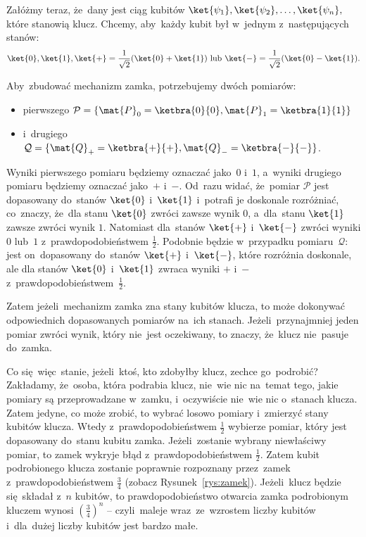 Załóżmy teraz, że~dany jest ciąg kubitów
$
	\ket{\psi_1},\ket{\psi_2},\ldots,\ket{\psi_n},
$
które stanowią klucz.
Chcemy, aby~każdy kubit był w~jednym z~następujących stanów:
$$
	\ket{0}, \ket{1}, \ket{+}=\frac{1}{\sqrt{2}}(\ket{0}+\ket{1}) \text{ lub } \ket{-}=\frac{1}{\sqrt{2}}(\ket{0}-\ket{1}).
$$

Aby~zbudować mechanizm zamka, potrzebujemy dwóch pomiarów:
\begin{itemize}
	\item pierwszego $\mathcal{P}=\{\mat{P}_0=\ketbra{0}{0}, \mat{P}_1=\ketbra{1}{1}\}$
	\item i~drugiego
	      $\mathcal{Q}=\{\mat{Q}_+=\ketbra{+}{+}, \mat{Q}_-=\ketbra{-}{-}\}$.
\end{itemize}
Wyniki pierwszego pomiaru
będziemy oznaczać jako~$0$ i~$1$, a~wyniki drugiego pomiaru będziemy oznaczać jako~$+$ i~$-$. Od~razu widać, że~pomiar
$\mathcal{P}$ jest dopasowany do~stanów $\ket{0}$ i~$\ket{1}$ i~potrafi
je doskonale rozróżniać, co~znaczy, że~dla stanu $\ket{0}$ zwróci zawsze wynik
$0$, a~dla~stanu $\ket{1}$ zawsze zwróci wynik $1$. Natomiast dla~stanów
$\ket{+}$ i~$\ket{-}$ zwróci wyniki $0$ lub~$1$ z~prawdopodobieństwem
$\frac{1}{2}$. Podobnie będzie w~przypadku pomiaru~$\mathcal{Q}$: jest
on~dopasowany do~stanów $\ket{+}$ i~$\ket{-}$, które rozróżnia doskonale,
ale dla stanów $\ket{0}$ i~$\ket{1}$ zwraca wyniki $+$ i~$-$ z~prawdopodobieństwem~$\frac{1}{2}$.

Zatem jeżeli~mechanizm zamka zna stany kubitów klucza, to może dokonywać
odpowiednich dopasowanych pomiarów na~ich stanach. Jeżeli~przynajmniej jeden pomiar zwróci
wynik, który nie~jest oczekiwany, to znaczy, że~klucz nie~pasuje do~zamka.

Co się~więc~stanie, jeżeli~ktoś, kto zdobyłby klucz, zechce go~podrobić?
Zakładamy, że~osoba, która podrabia klucz, nie~wie nic na~temat tego, jakie pomiary są
przeprowadzane w~zamku, i~oczywiście nie~wie nic o~stanach klucza. Zatem jedyne, co może zrobić,
to wybrać losowo pomiary i~zmierzyć stany kubitów klucza. Wtedy z~prawdopodobieństwem
$\frac{1}{2}$ wybierze pomiar, który jest dopasowany do~stanu kubitu zamka.
Jeżeli~zostanie wybrany niewłaściwy pomiar, to zamek wykryje błąd z~prawdopodobieństwem
$\frac{1}{2}$. Zatem kubit podrobionego klucza zostanie poprawnie
rozpoznany przez~zamek z~prawdopodobieństwem $\frac{3}{4}$ (zobacz Rysunek~\ref{rys:zamek}).
Jeżeli~klucz będzie się~składał z~$n$ kubitów, to prawdopodobieństwo otwarcia
zamka podrobionym kluczem wynosi $\left(\frac{3}{4}\right)^n$ -- czyli~maleje
wraz~ze~wzrostem liczby kubitów i~dla~dużej liczby kubitów jest bardzo małe.

